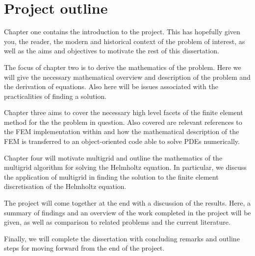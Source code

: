 \section{Project outline}

Chapter one contains the introduction to the project.
This has hopefully given you, the reader, the modern and historical context of the problem of interest, as well as the aims and objectives to motivate the rest of this dissertation.

The focus of chapter two is to derive the mathematics of the problem.
Here we will give the necessary mathematical overview and description of the problem and the derivation of equations.
Also here will be issues associated with the practicalities of finding a solution.

Chapter three aims to cover the necessary high level facets of the finite element method for the the problem in question.
Also covered are relevant references to the FEM implementation within \oomph and how the mathematical description of the FEM is transferred to an object-oriented code able to solve PDEs numerically.

Chapter four will motivate multigrid and outline the mathematics of the multigrid algorithm for solving the Helmholtz equation.
In particular, we discuss the application of multigrid in finding the solution to the finite element discretisation of the Helmholtz equation.

The project will come together at the end with a discussion of the results.
Here, a summary of findings and an overview of the work completed in the project will be given, as well as comparison to related problems and the current literature.

Finally, we will complete the dissertation with concluding remarks and outline steps for moving forward from the end of the project.